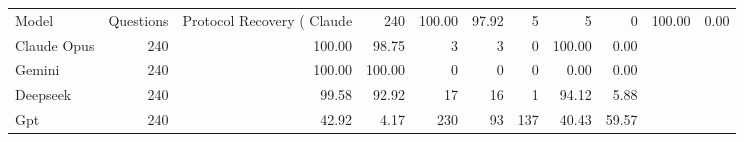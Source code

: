 \begin{tabular}{lrrrrrrrr}
\toprule
Model & Questions & Protocol Recovery (%
\midrule
Claude & 240 & 100.00 & 97.92 & 5 & 5 & 0 & 100.00 & 0.00 \\
Claude Opus & 240 & 100.00 & 98.75 & 3 & 3 & 0 & 100.00 & 0.00 \\
Gemini & 240 & 100.00 & 100.00 & 0 & 0 & 0 & 0.00 & 0.00 \\
Deepseek & 240 & 99.58 & 92.92 & 17 & 16 & 1 & 94.12 & 5.88 \\
Gpt & 240 & 42.92 & 4.17 & 230 & 93 & 137 & 40.43 & 59.57 \\
\bottomrule
\end{tabular}
